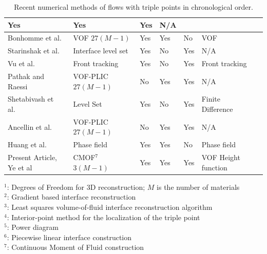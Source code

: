 \documentclass[]{article}
\begin{document}
\begin{table}[htbp]
{\begin{tabular}[h]{|C{2cm}|C{2cm}|C{2cm}|C{2cm}|C{2cm}|C{2cm}|C{2cm}|}
	                                         Yes & Yes & Yes & N/A \\ \hline
    Bonhomme et al.~\cite{bonhomme2012inertial} & VOF \newline $27(M-1)$ & Yes & Yes & No & VOF \\ \hline
    Starinshak et al.~\cite{starinshak2014new} & Interface level set & Yes & No & Yes & N/A \\ \hline
    Vu et al.~\cite{vu2015numerical} & Front tracking & Yes & No & Yes & Front tracking \\ \hline
    Pathak and Raessi\cite{pathak2016three} & VOF-PLIC \newline $27(M-1)$ & No & Yes & Yes & N/A \\ \hline
    Shetabivash et al.~\cite{shetabivash2020multiple} & Level Set & Yes & No & Yes & Finite Difference \\ \hline
    Ancellin et al.~\cite{ancellin2022extension} & VOF-PLIC \newline $27(M-1)$ & No & Yes & Yes & N/A \\ \hline
    Huang et al.~\cite{HUANG2022110795} & Phase field & Yes & Yes & No & Phase field \\ \hline
    Present Article, Ye et al & CMOF$^7$ \newline $3(M-1)$ & Yes & Yes & Yes & VOF Height function \\ \hline
  \end{tabular}
  }
 \scalebox{0.7}
 {
 \begin{minipage}{\textwidth}
   $^1$: Degrees of Freedom for 3D reconstruction; $M$ is the number of materials \\
   $^2$: Gradient based interface reconstruction\\
   $^3$: Least squares volume-of-fluid interface reconstruction algorithm\\
   $^4$: Interior-point method for the localization of the triple point\\
   $^5$: Power diagram\\
   $^6$: Piecewise linear interface construction\\
   $^7$: Continuous Moment of Fluid construction\\
   \end{minipage}
 }

\caption{Recent numerical methods of flows with triple points in 
  chronological order.  \label{tab:triple_point} }
\end{table}
\end{document}
